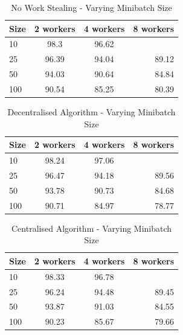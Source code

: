 \documentclass[12pt]{article}
\begin{document}
\begin{table}[htb]
\centering
\caption{No Work Stealing - Varying Minibatch Size}
\begin{tabular}{l | c | c | r}
Size & 2 workers & 4 workers & 8 workers \\ \hline
10                & 98.3      & 96.62     &           \\ \hline
25                & 96.39     & 94.04     & 89.12     \\ \hline
50                & 94.03     & 90.64     & 84.84     \\ \hline
100               & 90.54     & 85.25     & 80.39
\end{tabular}
\end{table}

\begin{table}[htb]
\centering
\caption{Decentralised Algorithm - Varying Minibatch Size}
\begin{tabular}{l | c | c | r}
Size & 2 workers & 4 workers & 8 workers \\ \hline
10                & 98.24     & 97.06     &           \\ \hline
25                & 96.47     & 94.18     & 89.56     \\ \hline
50                & 93.78     & 90.73     & 84.68     \\ \hline
100               & 90.71     & 84.97     & 78.77
\end{tabular}
\end{table}

\begin{table}[htb]
\centering
\caption{Centralised Algorithm - Varying Minibatch Size}
\begin{tabular}{l | c | c | r}
Size & 2 workers & 4 workers & 8 workers \\ \hline
10                & 98.33     & 96.78     &           \\ \hline
25                & 96.24     & 94.48     & 89.45     \\ \hline
50                & 93.87     & 91.03     & 84.55     \\ \hline
100               & 90.23     & 85.67     & 79.66
\end{tabular}
\end{table}
\end{document}

